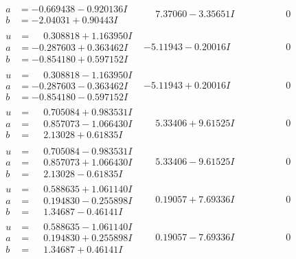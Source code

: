 \documentclass[1p]{elsarticle_modified}
\theoremstyle{definition}
\begin{document}
$$\begin{array}{c|c|c}
\begin{aligned}
a &= -0.669438 - 0.920136 I \\
b &= -2.04031 + 0.90443 I\end{aligned}
 & \phantom{-}7.37060 - 3.35651 I & \phantom{-0.000000 } 0 \\ \hline\begin{aligned}
u &= \phantom{-}0.308818 + 1.163950 I \\
a &= -0.287603 + 0.363462 I \\
b &= -0.854180 + 0.597152 I\end{aligned}
 & -5.11943 - 0.20016 I & \phantom{-0.000000 } 0 \\ \hline\begin{aligned}
u &= \phantom{-}0.308818 - 1.163950 I \\
a &= -0.287603 - 0.363462 I \\
b &= -0.854180 - 0.597152 I\end{aligned}
 & -5.11943 + 0.20016 I & \phantom{-0.000000 } 0 \\ \hline\begin{aligned}
u &= \phantom{-}0.705084 + 0.983531 I \\
a &= \phantom{-}0.857073 - 1.066430 I \\
b &= \phantom{-}2.13028 + 0.61835 I\end{aligned}
 & \phantom{-}5.33406 + 9.61525 I & \phantom{-0.000000 } 0 \\ \hline\begin{aligned}
u &= \phantom{-}0.705084 - 0.983531 I \\
a &= \phantom{-}0.857073 + 1.066430 I \\
b &= \phantom{-}2.13028 - 0.61835 I\end{aligned}
 & \phantom{-}5.33406 - 9.61525 I & \phantom{-0.000000 } 0 \\ \hline\begin{aligned}
u &= \phantom{-}0.588635 + 1.061140 I \\
a &= \phantom{-}0.194830 - 0.255898 I \\
b &= \phantom{-}1.34687 - 0.46141 I\end{aligned}
 & \phantom{-}0.19057 + 7.69336 I & \phantom{-0.000000 } 0 \\ \hline\begin{aligned}
u &= \phantom{-}0.588635 - 1.061140 I \\
a &= \phantom{-}0.194830 + 0.255898 I \\
b &= \phantom{-}1.34687 + 0.46141 I\end{aligned}
 & \phantom{-}0.19057 - 7.69336 I & \phantom{-0.000000 } 0\\

\end{array}$$
\end{document}
